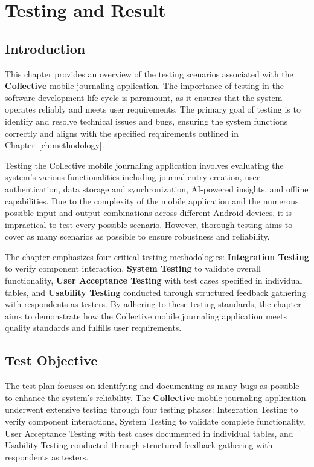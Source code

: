 \chapter{Testing and Result}\label{ch:testing}

\section{Introduction}\label{sec:testingIntroduction}

This chapter provides an overview of the testing scenarios associated with the \textbf{Collective} mobile journaling application. The importance of testing in the software development life cycle is paramount, as it ensures that the system operates reliably and meets user requirements. The primary goal of testing is to identify and resolve technical issues and bugs, ensuring the system functions correctly and aligns with the specified requirements outlined in Chapter~\ref{ch:methodology}.

Testing the Collective mobile journaling application involves evaluating the system's various functionalities including journal entry creation, user authentication, data storage and synchronization, AI-powered insights, and offline capabilities. Due to the complexity of the mobile application and the numerous possible input and output combinations across different Android devices, it is impractical to test every possible scenario. However, thorough testing aims to cover as many scenarios as possible to ensure robustness and reliability.

The chapter emphasizes four critical testing methodologies: \textbf{Integration Testing} to verify component interaction, \textbf{System Testing} to validate overall functionality, \textbf{User Acceptance Testing} with test cases specified in individual tables, and \textbf{Usability Testing} conducted through structured feedback gathering with respondents as testers. By adhering to these testing standards, the chapter aims to demonstrate how the Collective mobile journaling application meets quality standards and fulfills user requirements.

\section{Test Objective}\label{sec:testObjective}

The test plan focuses on identifying and documenting as many bugs as possible to enhance the system's reliability. The \textbf{Collective} mobile journaling application underwent extensive testing through four testing phases: Integration Testing to verify component interactions, System Testing to validate complete functionality, User Acceptance Testing with test cases documented in individual tables, and Usability Testing conducted through structured feedback gathering with respondents as testers.

